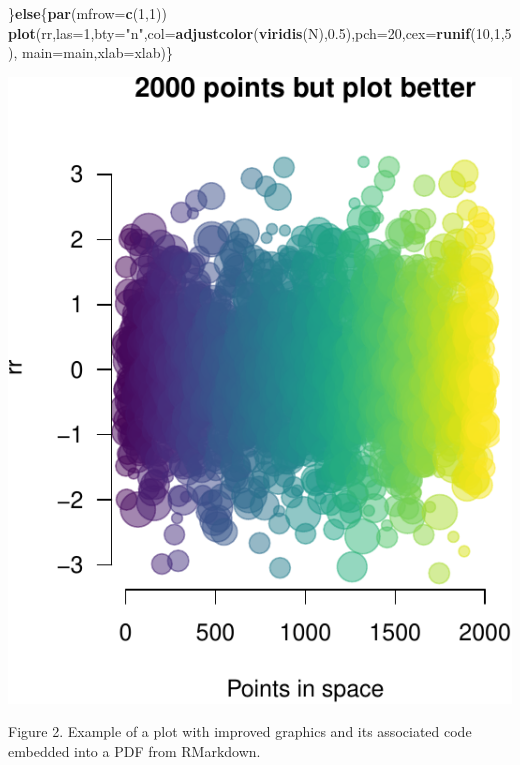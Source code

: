 \documentclass[portrait]{article}
\newenvironment{Shaded}{\begin{snugshade}}{\end{snugshade}}
\newcommand{\KeywordTok}[1]{\textcolor[rgb]{0.13,0.29,0.53}{\textbf{#1}}}
\newcommand{\DataTypeTok}[1]{\textcolor[rgb]{0.13,0.29,0.53}{#1}}
\newcommand{\DecValTok}[1]{\textcolor[rgb]{0.00,0.00,0.81}{#1}}
\newcommand{\FloatTok}[1]{\textcolor[rgb]{0.00,0.00,0.81}{#1}}
\newcommand{\StringTok}[1]{\textcolor[rgb]{0.31,0.60,0.02}{#1}}
\newcommand{\ControlFlowTok}[1]{\textcolor[rgb]{0.13,0.29,0.53}{\textbf{#1}}}
\newcommand{\NormalTok}[1]{#1}
\begin{document}
\begin{Shaded}
\begin{Highlighting}[]
\NormalTok{\}}\ControlFlowTok{else}\NormalTok{\{}\KeywordTok{par}\NormalTok{(}\DataTypeTok{mfrow=}\KeywordTok{c}\NormalTok{(}\DecValTok{1}\NormalTok{,}\DecValTok{1}\NormalTok{))}
  \KeywordTok{plot}\NormalTok{(rr,}\DataTypeTok{las=}\DecValTok{1}\NormalTok{,}\DataTypeTok{bty=}\StringTok{"n"}\NormalTok{,}\DataTypeTok{col=}\KeywordTok{adjustcolor}\NormalTok{(}\KeywordTok{viridis}\NormalTok{(N),}\FloatTok{0.5}\NormalTok{),}\DataTypeTok{pch=}\DecValTok{20}\NormalTok{,}\DataTypeTok{cex=}\KeywordTok{runif}\NormalTok{(}\DecValTok{10}\NormalTok{,}\DecValTok{1}\NormalTok{,}\DecValTok{5}\NormalTok{),}
       \DataTypeTok{main=}\NormalTok{main,}\DataTypeTok{xlab=}\NormalTok{xlab)\}}
\end{Highlighting}
\end{Shaded}

\includegraphics{Lesson5_rmd_files/figure-latex/unnamed-chunk-2-1.pdf}

Figure 2. Example of a plot with improved graphics and its associated
code embedded into a PDF from RMarkdown.

\newpage  
\end{document}
